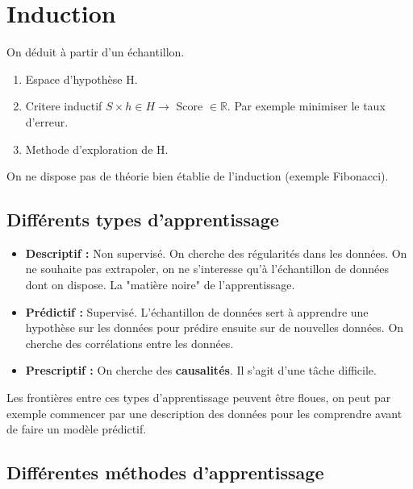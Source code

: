 \documentclass{article}
\begin{document}
\section{Induction}

On déduit à partir d'un échantillon.

\begin{enumerate}
\item Espace d'hypothèse H.
\item Critere inductif $ S \times h \in H \rightarrow $ Score $\in \mathbb{R}$. Par exemple minimiser le taux d'erreur.
\item Methode d'exploration de H.
\end{enumerate}

On ne dispose pas de théorie bien établie de l'induction (exemple Fibonacci).

\subsection{Différents types d'apprentissage}
\begin{itemize}
\item \textbf{Descriptif :} Non supervisé. On cherche des régularités dans les données. On ne souhaite pas extrapoler, on ne s'interesse qu'à l'échantillon de données dont on dispose. La "matière noire" de l'apprentissage.
\item \textbf{Prédictif :} Supervisé. L'échantillon de données sert à apprendre une hypothèse sur les données pour prédire ensuite sur de nouvelles données. On cherche des corrélations entre les données.
\item \textbf{Prescriptif :} On cherche des \textbf{causalités}. Il s'agit d'une tâche difficile.
\end{itemize}

Les frontières entre ces types d'apprentissage peuvent être floues, on peut par exemple commencer par une description des données pour les comprendre avant de faire un modèle prédictif.

\subsection{Différentes méthodes d'apprentissage}
\end{document}
